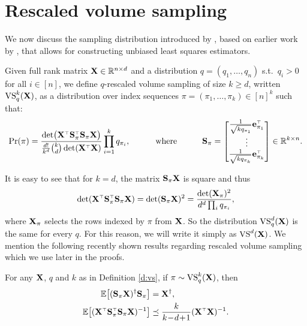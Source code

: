 \documentclass[12pt]{sty/colt2019/colt2018-arxiv}
\begin{document}
\section{Rescaled volume sampling}\label{s:vol}

We now discuss the sampling distribution introduced by
\cite{leveraged-volume-sampling}, based on earlier work by
\cite{avron-boutsidis13}, that allows for constructing
unbiased least squares estimators. 
\begin{definition}%
  \label{d:vs}
  Given full rank matrix $\mathbf X\in\mathbb R^{n\times d}$ and a distribution
  $q=(q_1,\dots,q_n)$ s.t.~$q_i> 0$ for all $i\in[n]$, we define
$q$-rescaled volume sampling of size $k\geq d$, written
${\mathrm{VS}}_q^k(\mathbf X)$, as a distribution 
over index sequences $\pi=(\pi_1,\dots,\pi_k)\in[n]^k$ such that:
\vspace{-4mm}
  \begin{align*}
    \Pr(\pi) =
    \frac{\det\!\big(\X^\top\S_\pi^\top\S_\pi\X\big)}{\frac{d!}{k^d}{k\choose
    d}\det(\X^\top\X)}\prod_{i=1}^kq_{\pi_i},\qquad\quad\text{where}\qquad\quad
    \S_\pi = \begin{bmatrix}\frac1{\sqrt{k q_{\pi_1}}}\e_{\pi_1}^\top\\
      \vdots\\\frac1{\sqrt{k q_{\pi_k}}}\e_{\pi_k}^\top\end{bmatrix}
    \in\R^{k\times n}. 
  \end{align*}
\end{definition}
\vspace{-1mm}
It is easy to see that for $k=d$, the matrix $\mathbf{S}_\pi\mathbf X$ is square 
and thus
\begin{align*}
  \det(\X^\top\S_\pi^\top\S_\pi\X)
    =\det(\S_\pi\X)^2=\frac{\det(\X_\pi)^2}{d^d\prod_i q_{\pi_i}},
\end{align*}
where $\mathbf X_\pi$ selects the rows indexed by $\pi$ from $\mathbf X$. So the
distribution ${\mathrm{VS}}_q^d(\mathbf X)$ is the same for every $q$. For this
reason, we will write it simply as ${\mathrm{VS}}^d(\mathbf X)$.
We mention the following
recently shown results regarding rescaled volume sampling which we use
later in the proofs. 
\begin{lemma}\label{l:expectations}
For any $\mathbf X$, $q$ and $k$ as in Definition \ref{d:vs}, if
$\pi\sim{\mathrm{VS}}_q^k(\mathbf X)$, then  
\begin{align}
  \E\big[(\S_\pi\X)^\dagger \S_\pi\big] &= \X^\dagger,\label{eq:unbiased}\\
  \E\big[(\X^\top\S_\pi^\top\S_\pi\X)^{-1}\big]
  &\preceq \frac k{k\!-\!d\!+\!1}(\X^\top\X)^{-1}.\label{eq:square-inverse}
\end{align}
\end{lemma}
\end{document}
